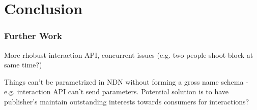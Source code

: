 \chapter{Conclusion}

\subsection{Further Work}
More rhobust interaction API, concurrent issues (e.g. two people shoot block at same time?)

Things can't be parametrized in NDN without forming a gross name schema - e.g. interaction API can't send parameters. Potential solution is to have publisher's maintain outstanding interests towards consumers for interactions?